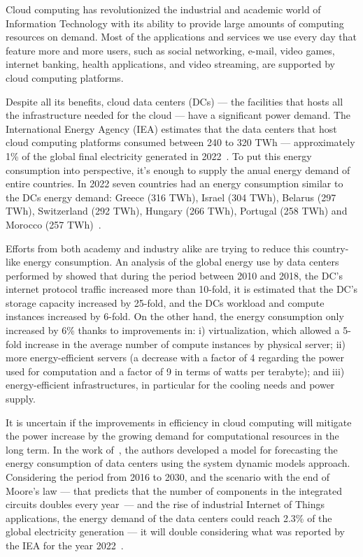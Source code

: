 Cloud computing has revolutionized the industrial and academic world of Information Technology with its ability to provide large amounts of computing resources on demand. Most of the applications and services we use every day that feature more and more users, such as social networking, e-mail, video games, internet banking, health applications, and video streaming, are supported by cloud computing platforms.

Despite all its benefits, cloud data centers (DCs) --- the facilities that hosts all the infrastructure needed for the cloud --- have a significant power demand. The International Energy Agency (IEA) estimates that the data centers  that host cloud computing platforms consumed between 240 to 320 TWh ---   approximately 1\% of the global final electricity generated in 2022~\cite{IEA_2022}. To put this energy consumption into perspective, it's enough to supply the anual energy demand of entire countries. In 2022 seven countries had an energy consumption similar to the DCs energy demand: Greece (316 TWh), Israel (304 TWh), Belarus (297 TWh), Switzerland (292 TWh), Hungary (266 TWh), Portugal (258 TWh) and Morocco (257 TWh)~\cite{owidenergy}.


Efforts from both academy and industry alike are trying to reduce this country-like energy consumption. An analysis of the global energy use by data centers performed by \citet{masanet2020recalibrating} showed that during the period between 2010 and 2018, the DC's internet protocol traffic increased more than 10-fold, it is estimated that the DC's storage capacity increased by 25-fold, and the DCs workload and compute instances increased by 6-fold. On the other hand, the energy consumption only increased by 6\% thanks to improvements in: i) virtualization, which allowed a 5-fold increase in the average number of compute instances by physical server; ii) more energy-efficient servers (a decrease with a factor of 4 regarding the power used for computation and a factor of 9 in terms of watts per terabyte); and iii) energy-efficient infrastructures, in particular for the cooling needs and power supply.

It is uncertain if the improvements in efficiency in cloud computing will mitigate the power increase by the growing demand for computational resources in the long term. In the work of~\citet{koot2021usage}, the authors developed a model for forecasting the energy consumption of data centers using the system dynamic models approach. Considering the period from 2016 to 2030, and the scenario with the end of Moore's law --- that predicts that the number of components in the integrated circuits doubles every year~\cite{Mack_2011_moorelaw}---  and the rise of industrial Internet of Things applications, the energy demand of the data centers could reach 2.3\% of the global electricity generation --- it will double considering what was reported by the IEA for the year 2022~\cite{IEA_2022}.

